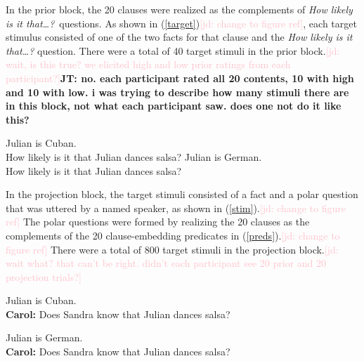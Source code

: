 \documentclass[11pt,fleqn]{article}
\newcommand{\jd}[1]{\textcolor{Pink}{[jd: #1]}}
\newcommand{\jt}[1]{\textbf{\color{blue}JT: #1}}
\newcommand{\6}{\mbox{$[\hspace*{-.6mm}[$}}
\newcommand{\9}{\mbox{$]\hspace*{-.6mm}]$}}
\begin{document}
In the prior block, the 20 clauses were realized as the complements of {\em How likely is it that\ldots?}~questions. As shown in (\ref{target})\jd{change to figure ref}, each target stimulus consisted of one of the two facts for that clause and the {\em How likely is it that\ldots?} question. There were a total of 40 target stimuli in the prior block.\jd{wait, is this true? we elicited high and low prior ratings from each participant?}\jt{no. each participant rated all 20 contents, 10 with high and 10 with low. i was trying to describe how many stimuli there are in this block, not what each participant saw. does one not do it like this?}

\begin{exe}
\ex\label{target}  %
\begin{xlist}
 Julian is Cuban. \\ How likely is it that Julian dances salsa?
 Julian is German.  \\ How likely is it that Julian dances salsa?
\end{xlist}
\end{exe}

In the projection block, the target stimuli consisted of a fact and a polar question that was uttered by a named speaker, as shown in (\ref{stim}).\jd{change to figure ref} The polar questions were formed by realizing the 20 clauses as the complements of the 20 clause-embedding predicates in (\ref{preds}).\jd{change to figure ref}   There were a total of 800 target stimuli in the projection block.\jd{wait what? that can't be right. didn't each participant see 20 prior and 20 projection trials?}

\begin{exe}
\ex\label{stim} %
\begin{xlist}
 Julian is Cuban.  \\ 
{\bf Carol:} Does Sandra know that Julian dances salsa?

 Julian is German.  \\ 
{\bf Carol:} Does Sandra know that Julian dances salsa?
\end{xlist}
\end{exe}
\end{document}
